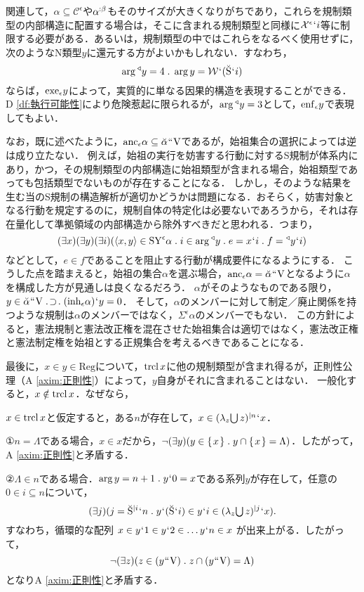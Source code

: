 関連して，$\alpha\subseteq\mathcal{C}^\epsilon$や$\alpha^{:\beta}$もそのサイズが大きくなりがちであり，これらを規制類型の内部構造に配置する場合は，そこに含まれる規制類型と同様に$ \mathcal{X}^\epsilon{\mspace{1mu}{`}\mspace{1mu}} i $等に制限する必要がある．あるいは，規制類型の中ではこれらをなるべく使用せずに，次のようなN類型$y$に還元する方がよいかもしれない．すなわち，
\[
   \arg\trgl{y} = 4\con{1}\arg y = \mathcal{W}\fap(\breve{\mathrm{S}}\fap i)
\]
ならば，$ \mathrm{exe}_{\epsilon}y $によって，実質的に単なる因果的構造を表現することができる．D \ref{df:執行可能性}により危険惹起に限られるが，$ \arg{^\triangleleft}y = 3 $として，$\mathrm{enf}_{\epsilon} y$で表現してもよい．

なお，既に述べたように，$\mathrm{anc}_\epsilon\alpha\subseteq\breve{\alpha}{\mspace{1mu}{``}\mspace{1mu}}\mathrm{V}$であるが，始祖集合の選択によっては逆は成り立たない．
例えば，始祖の実行を妨害する行動に対するS規制が体系内にあり，かつ，その規制類型の内部構造に始祖類型が含まれる場合，始祖類型であっても包括類型でないものが存在することになる．
しかし，そのような結果を生む当のS規制の構造解析が適切かどうかは問題になる．おそらく，妨害対象となる行動を規定するのに，規制自体の特定化は必要ないであろうから，それは存在量化して準拠領域の内部構造から除外すべきだと思われる．つまり，
\[
    (\exists x)(\exists y)(\exists i)(\orp{x,y}\in \mathrm{SY}^{\epsilon}\alpha\con{1}i\in\arg \trgl{y}\con{1}
    e = x\fap i\con{1}f = \trgl{y}\fap i)
\]
などとして，$ e\in f $であることを阻止する行動が構成要件になるようにする．
こうした点を踏まえると，始祖の集合$\alpha$を選ぶ場合，$ \mathrm{anc}_\epsilon\alpha = \breve{\alpha}{\mspace{1mu}{``}\mspace{1mu}}\mathrm{V} $となるように$\alpha$を構成した方が見通しは良くなるだろう．
$\alpha$がそのようなものである限り，$ y\in\breve{\alpha}\img\univ\case{1}{1}{1}(\mathrm{inh}_\epsilon\alpha)\fap y = 0 $．
そして，$ \alpha $のメンバーに対して制定／廃止関係を持つような規制は$ \alpha $のメンバーではなく，$ \varSigma^{\epsilon}\alpha $のメンバーでもない．
この方針によると，憲法規制と憲法改正権を混在させた始祖集合は適切ではなく，憲法改正権と憲法制定権を始祖とする正規集合を考えるべきであることになる．

最後に，$ x\in y\in\mathrm{Reg} $について，$ \operatorname{trcl} x $に他の規制類型が含まれ得るが，正則性公理（A \ref{axim:正則性}）によって，$y$自身がそれに含まれることはない．
一般化すると，$ x\notin\operatorname{trcl} x $．なぜなら，
\begin{pfx}
$ x\in\operatorname{trcl} x $と仮定すると，ある$n$が存在して，$ x\in (\lambda_z{\textstyle\bigcup}\mspace{3mu}z)^{\mid n}{\mspace{1mu}{`}\mspace{1mu}} x $．

①$n=\Lambda$である場合，$x\in x$だから，$\neg(\exists y)(y\in\classab{x}\con{1}y\cap\classab{x}=\Lambda)$．したがって，A \ref{axim:正則性}と矛盾する．

②$ \Lambda\in n $である場合．$\arg y = n+1\con{1}y\fap 0 = x $である系列$y$が存在して，任意の$ 0\in i\subseteq n $について，
\[
    (\exists j)(
        j = \iter{\breve{\mathrm{S}}}{i}\fap n\con{1}
        y\fap(\breve{\mathrm{S}}\fap i)\in y\fap i \in \iter{(\lambda_z\union{z})}{j}\fap x
    ).
\]
すなわち，循環的な配列 $ x\in y{\mspace{1mu}{`}\mspace{1mu}} 1\in y{\mspace{1mu}{`}\mspace{1mu}} 2 \in \dots y{\mspace{1mu}{`}\mspace{1mu}} n\in x $ が出来上がる．したがって，
\[
    \neg(\exists z)(z\in(y\img\univ)\con{1}z\cap(y\img\univ)=\Lambda)
\]
となりA \ref{axim:正則性}と矛盾する．
\end{pfx}

